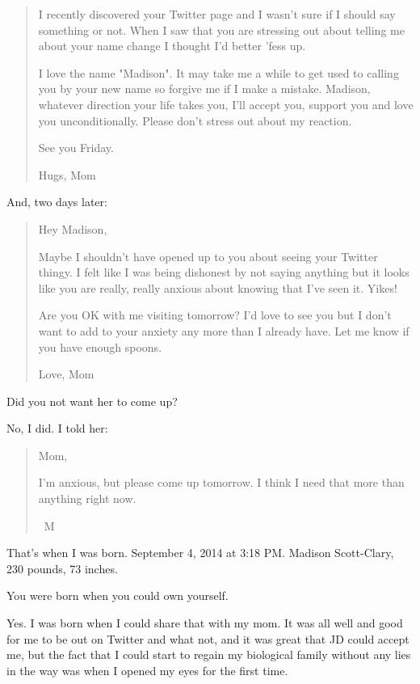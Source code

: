 \begin{quotation}
I recently discovered your Twitter page and I wasn't sure if I should say something or not.  When I saw that you are stressing out about telling me about your name change I thought I'd better 'fess up.

I love the name "Madison".  It may take me a while to get used to calling you by your new name so forgive me if I make a mistake.  Madison, whatever direction your life takes you, I'll accept you, support you and love you unconditionally.  Please don't stress out about my reaction.

See you Friday.

Hugs,
Mom
\end{quotation}

And, two days later:

\begin{quotation}
Hey Madison,

Maybe I shouldn't have opened up to you about seeing your Twitter thingy.  I felt like I was being dishonest by not saying anything but it looks like you are really, really anxious about knowing that I've seen it.  Yikes!

Are you OK with me visiting tomorrow?  I'd love to see you but I don't want to add to your anxiety any more than I already have.  Let me know if you have enough spoons.

Love,
Mom
\end{quotation}

\begin{ally}
Did you not want her to come up?
\end{ally}
No, I did. I told her:

\begin{quotation}
Mom,

I'm anxious, but please come up tomorrow. I think I need that more than anything right now.

~M
\end{quotation}

That's when I was born. September 4, 2014 at 3:18 PM. Madison Scott-Clary, 230 pounds, 73 inches.

\begin{ally}
You were born when you could own yourself.
\end{ally}
Yes. I was born when I could share that with my mom. It was all well and good for me to be out on Twitter and what not, and it was great that JD could accept me, but the fact that I could start to regain my biological family without any lies in the way was when I opened my eyes for the first time.

